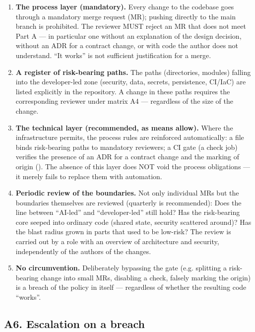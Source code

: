 \begin{enumerate}[label=\textbf{A5.\arabic*}]
\item \textbf{The process layer (mandatory).}
Every change to the codebase goes through a mandatory merge request (MR); pushing directly to the main branch is prohibited.
The reviewer MUST reject an MR that does not meet Part A --- in particular one without an explanation of the design decision, without an ADR for a contract change, or with code the author does not understand.
\enquote{It works} is not sufficient justification for a merge.
\item \textbf{A register of risk-bearing paths.}
The paths (directories, modules) falling into the developer-led zone (security, data, secrets, persistence, CI/IaC) are listed explicitly in the repository.
A change in these paths requires the corresponding reviewer under matrix A4 --- regardless of the size of the change.
\item \textbf{The technical layer (recommended, as means allow).}
Where the infrastructure permits, the process rules are reinforced automatically:
a  file binds risk-bearing paths to mandatory reviewers;
a CI gate (a check job) verifies the presence of an ADR for a contract change and the marking of origin (\code{[ai-generated]}).
The absence of this layer does NOT void the process obligations --- it merely fails to replace them with automation.
\item \textbf{Periodic review of the boundaries.}
Not only individual MRs but the boundaries themselves are reviewed (quarterly is recommended):
Does the line between \enquote{AI-led} and \enquote{developer-led} still hold?
Has the risk-bearing core seeped into ordinary code (shared state, security scattered around)?
Has the blast radius grown in parts that used to be low-risk?
The review is carried out by a role with an overview of architecture and security, independently of the authors of the changes.
\item \textbf{No circumvention.}
Deliberately bypassing the gate (e.g. splitting a risk-bearing change into small MRs, disabling a check, falsely marking the origin) is a breach of the policy in itself --- regardless of whether the resulting code \enquote{works}.
\end{enumerate}

\subsection{A6. Escalation on a breach}


